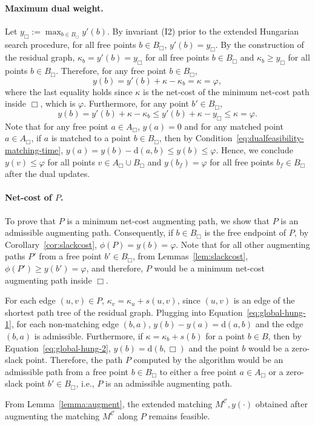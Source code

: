 \documentclass[11pt,onecolumn]{article}
\def\mcC{{\mathcal{C}}}
\newcommand{\cell}{\Box}
\newcommand{\distancetocell}[2]{\mathrm{d}(#1, #2)}
\newcommand{\distance}[2]{\mathrm{d}(#1, #2)}
\newcommand{\ymax}{\varphi}
\newcommand\myparagraph[1]{\paragraph{#1}}
\begin{document}
    


\myparagraph{Maximum dual weight.} Let $y_{\cell}:=\max_{b\in B_\cell}y'(b)$. By invariant (I2) prior to the extended Hungarian search procedure, for all free points $b\in B_\cell$, $y'(b)=y_{\cell}$. By the construction of the residual graph, $\kappa_b=y'(b)=y_\cell$ for all free points $b\in B_\cell$ and $\kappa_b\ge y_\cell$ for all points $b\in B_\cell$. Therefore, for any free point $b\in B_\cell$, 
\[y(b) = y'(b)+\kappa-\kappa_{b} = \kappa=\ymax,\]
where the last equality holds since $\kappa$ is the net-cost of the minimum net-cost path inside $\cell$, which is $\ymax$.
Furthermore, for any point $b'\in B_\cell$,
\[y(b) = y'(b)+\kappa-\kappa_{b} \le y'(b)+\kappa-y_\cell \le \kappa=\ymax.\]
Note that for any free point $a\in A_\cell$, $y(a)=0$ and for any matched point $a\in A_\cell$, if $a$ is matched to a point $b\in B_\cell$, then by Condition~\eqref{eq:dualfeasibility-matching-time}, $y(a)=y(b)-\distance{a}{b}\le y(b)\le \ymax$. 
Hence, we conclude $y(v)\le \ymax$ for all points $v\in A_\cell\cup B_\cell$ and $y(b_f)=\ymax$ for all free points $b_f\in B_\cell$ after the dual updates. 



\myparagraph{Net-cost of $P$.} To prove that $P$ is a minimum net-cost augmenting path, we show that $P$ is an admissible augmenting path. Consequently, if $b\in B_\cell$ is the free endpoint of $P$, by Corollary~\ref{cor:slackcost}, $\phi(P)=y(b)=\ymax$. Note that for all other augmenting paths $P'$ from a free point $b'\in B_\cell$, from Lemmas~\ref{lem:slackcost}, $\phi(P')\ge y(b')=\ymax$, and therefore, $P$ would be a minimum net-cost augmenting path inside $\cell$.

For each edge $(u,v)\in P$, $\kappa_v = \kappa_u + s(u,v)$, since $(u,v)$ is an edge of the shortest path tree of the residual graph. Plugging into Equation~\eqref{eq:global-hung-1}, for each non-matching edge $(b,a)$, $y(b)-y(a)=\distance{a}{b}$ and the edge $(b,a)$ is admissible. Furthermore, if $\kappa=\kappa_b+s(b)$ for a point $b\in B$, then by Equation~\eqref{eq:global-hung-2}, $y(b)=\distancetocell{b}{\cell}$ and the point $b$ would be a zero-slack point. Therefore, the path $P$ computed by the algorithm would be an admissible path from a free point $b\in B_\cell$ to either a free point $a\in A_\cell$ or a zero-slack point $b'\in B_\cell$, i.e., $P$ is an admissible augmenting path. 

From Lemma~\ref{lemma:augment}, the extended matching $M^\mcC, y(\cdot)$ obtained after augmenting the matching $M^\mcC$ along $P$ remains feasible.
\end{document}
